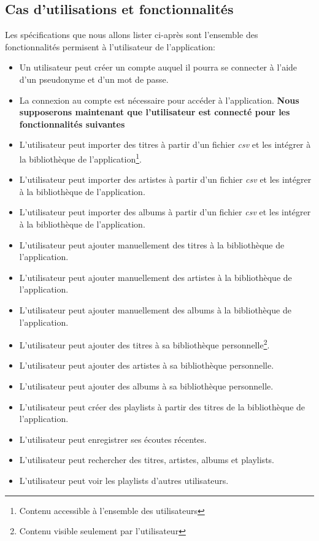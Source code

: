 \documentclass[a4paper,10pt, french]{report}
\begin{document}
  \subsection{Cas d'utilisations et fonctionnalités}
    Les spécifications que nous allons lister ci-après sont l'ensemble des fonctionnalités permisent à l'utilisateur de l'application:
    \begin{itemize}
      \item Un utilisateur peut créer un compte auquel il pourra se connecter à l'aide d'un pseudonyme et d'un mot de passe.
      \item La connexion au compte est nécessaire pour accéder à l'application. \newline
        \textbf{Nous supposerons maintenant que l'utilisateur est connecté pour les fonctionnalités suivantes}
      \item L'utilisateur peut importer des titres à partir d'un fichier \emph{csv} et les intégrer à la bibliothèque de l'application\footnote{Contenu accessible à l'ensemble des utilisateurs}.
      \item L'utilisateur peut importer des artistes à partir d'un fichier \emph{csv} et les intégrer à la bibliothèque de l'application.
      \item L'utilisateur peut importer des albums à partir d'un fichier \emph{csv} et les intégrer à la bibliothèque de l'application.
      \item L'utilisateur peut ajouter manuellement des titres à la bibliothèque de l'application.
      \item L'utilisateur peut ajouter manuellement des artistes à la bibliothèque de l'application.
      \item L'utilisateur peut ajouter manuellement des albums à la bibliothèque de l'application.
      \item L'utilisateur peut ajouter des titres à sa bibliothèque personnelle\footnote{Contenu visible seulement par l'utilisateur}.
      \item L'utilisateur peut ajouter des artistes à sa bibliothèque personnelle.
      \item L'utilisateur peut ajouter des albums à sa bibliothèque personnelle.
      \item L'utilisateur peut créer des playlists à partir des titres de la bibliothèque de l'application.
      \item L'utilisateur peut enregistrer ses écoutes récentes.
      \item L'utilisateur peut rechercher des titres, artistes, albums et playlists.
      \item L'utilisateur peut voir les playlists d'autres utilisateurs.
    \end{itemize}
\end{document}
